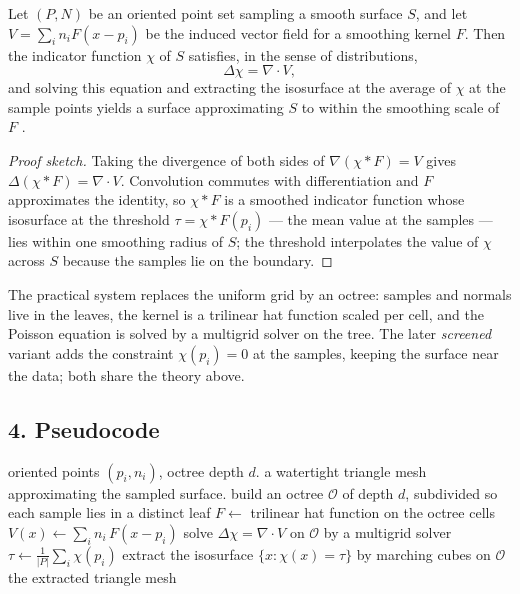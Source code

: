 \begin{theorem}\label{thm:shape_poisson}
  Let $(P, N)$ be an oriented point set sampling a smooth surface $S$, and let
  $V = \sum_i n_i F(x - p_i)$ be the induced vector field for a smoothing
  kernel $F$. Then the indicator function $\chi$ of $S$ satisfies, in the
  sense of distributions,
  \[
  \Delta \chi = \nabla \cdot V,
  \]
  and solving this equation and extracting the isosurface at the average of
  $\chi$ at the sample points yields a surface approximating $S$ to within the
  smoothing scale of $F$ \cite{kazhdan2006}.
\end{theorem}

\begin{proof}[Proof sketch]
  Taking the divergence of both sides of $\nabla(\chi * F) = V$ gives
  $\Delta(\chi * F) = \nabla \cdot V$. Convolution commutes with
  differentiation and $F$ approximates the identity, so $\chi * F$ is a
  smoothed indicator function whose isosurface at the threshold
  $\tau = \chi * F(p_i)$ --- the mean value at the samples --- lies within one
  smoothing radius of $S$; the threshold interpolates the value of $\chi$
  across $S$ because the samples lie on the boundary.
\end{proof}

The practical system \cite{kazhdan2006} replaces the uniform grid by an
octree: samples and normals live in the leaves, the kernel is a trilinear hat
function scaled per cell, and the Poisson equation is solved by a multigrid
solver on the tree. The later \emph{screened} variant adds the constraint
$\chi(p_i) = 0$ at the samples, keeping the surface near the data; both share
the theory above.

\subsection{4. Pseudocode}

\begin{algorithm}[htbp]
\caption{Poisson Surface Reconstruction}
\label{alg:shape_poisson_reconstruction}
\begin{algorithmic}[1]
\Require oriented points $(p_i, n_i)$, octree depth $d$.
\Ensure a watertight triangle mesh approximating the sampled surface.
  \State build an octree $\mathcal{O}$ of depth $d$, subdivided so each sample lies in a distinct leaf
  \State $F \gets$ trilinear hat function on the octree cells
  \State $V(x) \gets \sum_i n_i \, F(x - p_i)$ 
  \State solve $\Delta \chi = \nabla \cdot V$ on $\mathcal{O}$ by a multigrid solver
  \State $\tau \gets \frac{1}{|P|} \sum_i \chi(p_i)$
  \State extract the isosurface $\{ x : \chi(x) = \tau \}$ by marching cubes on $\mathcal{O}$
  \State \Return the extracted triangle mesh
\EndFunction
\end{algorithmic}
\end{algorithm}

